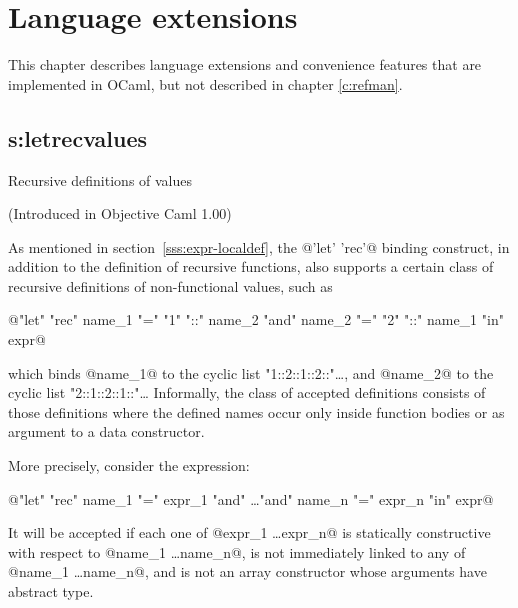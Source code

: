 \chapter{Language extensions} \label{c:extensions}

This chapter describes language extensions and convenience features
that are implemented in OCaml, but not described in chapter \ref{c:refman}.


\section{s:letrecvalues}{Recursive definitions of values}

(Introduced in Objective Caml 1.00)

As mentioned in section~\ref{sss:expr-localdef}, the @'let' 'rec'@ binding
construct, in addition to the definition of recursive functions,
also supports a certain class of recursive definitions of
non-functional values, such as
\begin{center}
@"let" "rec" name_1 "=" "1" "::" name_2
"and" name_2 "=" "2" "::" name_1
"in" expr@
\end{center}
which binds @name_1@ to the cyclic list "1::2::1::2::"\ldots, and
@name_2@ to the cyclic list "2::1::2::1::"\ldots
Informally, the class of accepted definitions consists of those
definitions where the defined names occur only inside function
bodies or as argument to a data constructor.

More precisely, consider the expression:
\begin{center}
@"let" "rec" name_1 "=" expr_1 "and" \ldots "and" name_n "=" expr_n "in" expr@
\end{center}
It will be accepted if each one of @expr_1 \ldots expr_n@ is
statically constructive with respect to @name_1 \ldots name_n@,
is not immediately linked to any of @name_1 \ldots name_n@,
and is not an array constructor whose arguments have abstract type.


